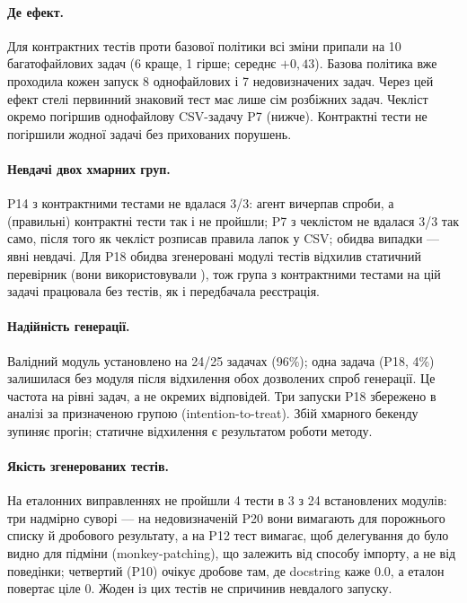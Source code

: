 \documentclass[11pt]{article}
\begin{document}
\paragraph{Де ефект.} Для контрактних тестів проти базової політики всі зміни припали на 10 багатофайлових задач (6 краще, 1 гірше; середнє $+0{,}43$). Базова політика вже проходила кожен запуск 8 однофайлових і 7 недовизначених задач. Через цей ефект стелі первинний знаковий тест має лише сім розбіжних задач. Чекліст окремо погіршив однофайлову CSV-задачу P7 (нижче). Контрактні тести не погіршили жодної задачі без прихованих порушень.

\paragraph{Невдачі двох хмарних груп.} P14 з контрактними тестами не вдалася 3/3: агент вичерпав спроби, а (правильні) контрактні тести так і не пройшли; P7 з чеклістом не вдалася 3/3 так само, після того як чекліст розписав правила лапок у CSV; обидва випадки --- явні невдачі. Для P18 обидва згенеровані модулі тестів відхилив статичний перевірник (вони використовували ), тож група з контрактними тестами на цій задачі працювала без тестів, як і передбачала реєстрація.

\paragraph{Надійність генерації.} Валідний модуль установлено на 24/25 задачах (96\%); одна задача (P18, 4\%) залишилася без модуля після відхилення обох дозволених спроб генерації. Це частота на рівні задач, а не окремих відповідей. Три запуски P18 збережено в аналізі за призначеною групою (intention-to-treat). Збій хмарного бекенду зупиняє прогін; статичне відхилення є результатом роботи методу.

\paragraph{Якість згенерованих тестів.} На еталонних виправленнях не пройшли 4 тести в 3 з 24 встановлених модулів: три надмірно суворі --- на недовизначеній P20 вони вимагають  для порожнього списку й дробового результату, а на P12 тест вимагає, щоб делегування до  було видно для підміни (monkey-patching), що залежить від способу імпорту, а не від поведінки; четвертий (P10) очікує дробове  там, де docstring каже 0.0, а еталон повертає ціле 0. Жоден із цих тестів не спричинив невдалого запуску.
\end{document}
